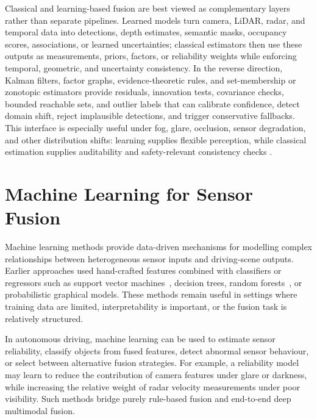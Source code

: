 Classical and learning-based fusion are best viewed as complementary layers rather than separate pipelines. Learned models turn camera, LiDAR, radar, and temporal data into detections, depth estimates, semantic masks, occupancy scores, associations, or learned uncertainties; classical estimators then use these outputs as measurements, priors, factors, or reliability weights while enforcing temporal, geometric, and uncertainty consistency. In the reverse direction, Kalman filters, factor graphs, evidence-theoretic rules, and set-membership or zonotopic estimators provide residuals, innovation tests, covariance checks, bounded reachable sets, and outlier labels that can calibrate confidence, detect domain shift, reject implausible detections, and trigger conservative fallbacks. This interface is especially useful under fog, glare, occlusion, sensor degradation, and other distribution shifts: learning supplies flexible perception, while classical estimation supplies auditability and safety-relevant consistency checks \cite{khaleghi_multisensor_2013,baltrusaitis_multimodal_2019,li2022_gp_zkf}.


\section{Machine Learning for Sensor Fusion}
%
Machine learning methods provide data-driven mechanisms for modelling complex relationships between heterogeneous sensor inputs and driving-scene outputs. Earlier approaches used hand-crafted features combined with classifiers or regressors such as support vector machines~\cite{cortes1995_svm}, decision trees, random forests~\cite{breiman2001_rf}, or probabilistic graphical models. These methods remain useful in settings where training data are limited, interpretability is important, or the fusion task is relatively structured.

In autonomous driving, machine learning can be used to estimate sensor reliability, classify objects from fused features, detect abnormal sensor behaviour, or select between alternative fusion strategies. For example, a reliability model may learn to reduce the contribution of camera features under glare or darkness, while increasing the relative weight of radar velocity measurements under poor visibility. Such methods bridge purely rule-based fusion and end-to-end deep multimodal fusion.

